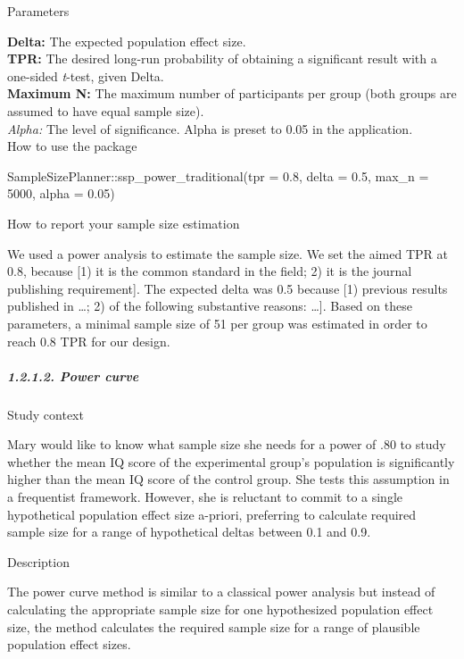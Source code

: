 \documentclass[
  english,
  man,floatsintext]{apa6}
\newenvironment{Shaded}{\begin{snugshade}}{\end{snugshade}}
\newcommand{\AttributeTok}[1]{\textcolor[rgb]{0.77,0.63,0.00}{#1}}
\newcommand{\DecValTok}[1]{\textcolor[rgb]{0.00,0.00,0.81}{#1}}
\newcommand{\FloatTok}[1]{\textcolor[rgb]{0.00,0.00,0.81}{#1}}
\newcommand{\FunctionTok}[1]{\textcolor[rgb]{0.00,0.00,0.00}{#1}}
\newcommand{\NormalTok}[1]{#1}
\newcommand{\SpecialCharTok}[1]{\textcolor[rgb]{0.00,0.00,0.00}{#1}}
\let\oldsubparagraph\subparagraph
\renewcommand{\subparagraph}[1]{\oldsubparagraph{#1}\mbox{}}
\begin{document}
Parameters

\textbf{Delta:} The expected population effect size.\\
\textbf{TPR:} The desired long-run probability of obtaining a significant result with a one-sided \emph{t}-test, given Delta.\\
\textbf{Maximum N:} The maximum number of participants per group (both groups are assumed to have equal sample size).\\
\emph{Alpha:} The level of significance. Alpha is preset to 0.05 in the application.\\

How to use the package

\begin{Shaded}
\begin{Highlighting}[]
\NormalTok{SampleSizePlanner}\SpecialCharTok{::}\FunctionTok{ssp\_power\_traditional}\NormalTok{(}\AttributeTok{tpr =} \FloatTok{0.8}\NormalTok{, }\AttributeTok{delta =} \FloatTok{0.5}\NormalTok{, }
    \AttributeTok{max\_n =} \DecValTok{5000}\NormalTok{, }\AttributeTok{alpha =} \FloatTok{0.05}\NormalTok{)}
\end{Highlighting}
\end{Shaded}

How to report your sample size estimation

We used a power analysis to estimate the sample size. We set the aimed TPR at 0.8, because {[}1) it is the common standard in the field; 2) it is the journal publishing requirement{]}. The expected delta was 0.5 because {[}1) previous results published in \ldots; 2) of the following substantive reasons: \ldots{]}. Based on these parameters, a minimal sample size of 51 per group was estimated in order to reach 0.8 TPR for our design.

\hypertarget{power-curve}{%
\subparagraph{1.2.1.2. Power curve}\label{power-curve}}

Study context

Mary would like to know what sample size she needs for a power of .80 to study whether the mean IQ score of the experimental group's population is significantly higher than the mean IQ score of the control group. She tests this assumption in a frequentist framework. However, she is reluctant to commit to a single hypothetical population effect size a-priori, preferring to calculate required sample size for a range of hypothetical deltas between 0.1 and 0.9.

Description

The power curve method is similar to a classical power analysis but instead of calculating the appropriate sample size for one hypothesized population effect size, the method calculates the required sample size for a range of plausible population effect sizes.
\end{document}
